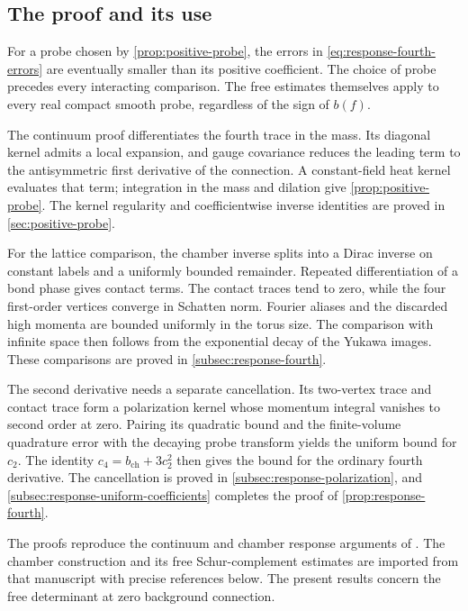 \subsection{The proof and its use}

For a probe chosen by \cref{prop:positive-probe}, the errors in
\eqref{eq:response-fourth-errors} are eventually smaller than its
positive coefficient. The choice of probe precedes every
interacting comparison. The free estimates themselves apply to
every real compact smooth probe, regardless of the sign of $b(f)$.

The continuum proof differentiates the fourth trace in the mass.
Its diagonal kernel admits a local expansion, and gauge covariance
reduces the leading term to the antisymmetric first derivative of
the connection. A constant-field heat kernel evaluates that term;
integration in the mass and dilation give \cref{prop:positive-probe}.
The kernel regularity and coefficientwise inverse identities are
proved in \cref{sec:positive-probe}.

For the lattice comparison, the chamber inverse splits into a
Dirac inverse on constant labels and a uniformly bounded remainder.
Repeated differentiation of a bond phase gives contact terms.
The contact traces tend to zero, while the four first-order
vertices converge in Schatten norm. Fourier aliases and the
discarded high momenta are bounded uniformly in the torus size.
The comparison with infinite space then follows from the
exponential decay of the Yukawa images. These comparisons are
proved in \cref{subsec:response-fourth}.

The second derivative needs a separate cancellation. Its
two-vertex trace and contact trace form a polarization kernel whose
momentum integral vanishes to second order at zero. Pairing its
quadratic bound and the finite-volume quadrature error with the
decaying probe transform yields the uniform bound for $c_2$.
The identity $c_4=b_{\mathrm{ch}}+3c_2^2$ then gives the bound
for the ordinary fourth derivative. The cancellation is proved in
\cref{subsec:response-polarization}, and
\cref{subsec:response-uniform-coefficients} completes the proof of
\cref{prop:response-fourth}.

The proofs reproduce the continuum and chamber response arguments
of \cite[\S17--18]{QED3Master}. The chamber construction and its
free Schur-complement estimates are imported from that manuscript
with precise references below. The present results concern the
free determinant at zero background connection.

